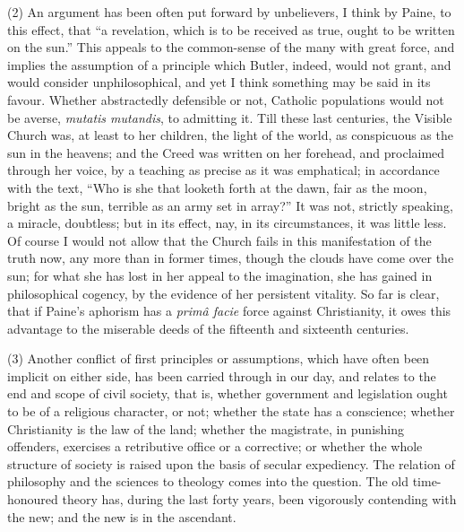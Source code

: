 (2) An argument has been often put forward by unbelievers, I think
by Paine, to this effect, that ``a revelation, which is to be
received as true, ought to be written on the sun.'' This appeals
to the common-sense of the many with great force, and implies the
assumption of a principle which Butler, indeed, would not grant, and
would consider unphilosophical, and yet I think something may be said
in its favour. Whether abstractedly defensible or not, Catholic
populations would not be averse, \emph{mutatis mutandis}, to admitting
it. Till these last centuries, the Visible Church was, at least to her
children, the light of the world, as conspicuous as the sun in the
heavens; and the Creed was written on her forehead, and proclaimed
through her voice, by a teaching as precise as it was emphatical; in
accordance with the text, ``Who is she that looketh forth at the
dawn, fair as the moon, bright as the sun, terrible as an army set in
array?'' It was not, strictly speaking, a miracle, doubtless; but
in its effect, nay, in its circumstances, it was little less. Of
course I would not allow that the Church fails in this manifestation
of the truth now, any more than in former times, though the clouds
have come over the sun; for what she has lost in her appeal to the
imagination, she has gained in philosophical cogency, by the evidence
of her persistent vitality. So far is clear, that if Paine's aphorism
has a \emph{primâ facie} force against Christianity, it owes this
advantage to the miserable deeds of the fifteenth and sixteenth
centuries.

(3) Another conflict of first principles or assumptions, which have
often been implicit on either side, has been carried through in our
day, and relates to the end and scope of civil society, that is,
whether government and legislation ought to be of a religious
character, or not; whether the state has a conscience; whether
Christianity is the law of the land; whether the magistrate, in
punishing offenders, exercises a retributive office or a corrective;
or whether the whole structure of society is raised upon the basis of
secular expediency. The relation of philosophy and the sciences to
theology comes into the question. The old time-honoured theory has,
during the last forty years, been vigorously contending with the new;
and the new is in the ascendant.

